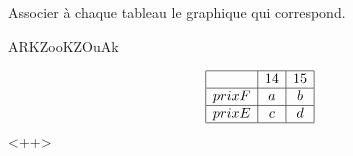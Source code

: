 
Associer à chaque tableau le graphique qui correspond.


ARKZooKZOuAk

\begin{equation}
\begin{array}[]{|c|c|c|}
\hline
&14&15\\
\hline
prix F&a&b\\
\hline
prix E&c&d\\
\hline
\end{array}
\end{equation}
<++>

